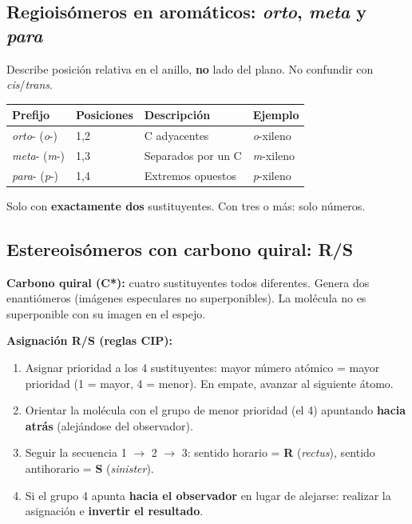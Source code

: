 {}
\subsection*{\textcolor{blueunam}{Regioisómeros en aromáticos: \textit{orto}, \textit{meta} y \textit{para}}}

Describe posición relativa en el anillo, \textbf{no} lado del plano.
No confundir con \textit{cis}/\textit{trans}.

\begin{longtable}{C{2.4cm} C{2.0cm} C{4.0cm} C{5.1cm}}
\toprule
\textbf{Prefijo} & \textbf{Posiciones} & \textbf{Descripción} & \textbf{Ejemplo} \\
\midrule\endhead\bottomrule\endlastfoot
\textit{orto}- (\textit{o}-) & 1,2 & C adyacentes  & \textit{o}-xileno \\
\textit{meta}- (\textit{m}-) & 1,3 & Separados por un C & \textit{m}-xileno \\
\textit{para}- (\textit{p}-) & 1,4 & Extremos opuestos  & \textit{p}-xileno \\
\end{longtable}

Solo con \textbf{exactamente dos} sustituyentes. Con tres o más: solo números.

{}
\subsection*{\textcolor{blueunam}{Estereoisómeros con carbono quiral: R/S}}

\textbf{Carbono quiral (C*):} cuatro sustituyentes todos diferentes. Genera dos
enantiómeros (imágenes especulares no superponibles). La molécula no es superponible
con su imagen en el espejo.

\textbf{Asignación R/S (reglas CIP):}
\begin{enumerate}
\item Asignar prioridad a los 4 sustituyentes: mayor número atómico = mayor prioridad (1 = mayor, 4 = menor). En empate, avanzar al siguiente átomo.
\item Orientar la molécula con el grupo de menor prioridad (el 4) apuntando \textbf{hacia atrás} (alejándose del observador).
\item Seguir la secuencia 1 $\to$ 2 $\to$ 3: sentido horario = \textbf{R} (\textit{rectus}), sentido antihorario = \textbf{S} (\textit{sinister}).
\item Si el grupo 4 apunta \textbf{hacia el observador} en lugar de alejarse: realizar la asignación e \textbf{invertir el resultado}.
\end{enumerate}

